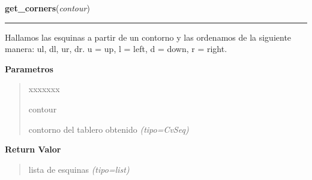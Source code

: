     \label{src:search_goban:get_corners}

    \vspace{0.5ex}

\hspace{.8\funcindent}\begin{boxedminipage}{\funcwidth}

    \raggedright \textbf{get\_corners}(\textit{contour})

    \vspace{-1.5ex}

    \rule{\textwidth}{0.5\fboxrule}
\setlength{\parskip}{2ex}
Hallamos las esquinas a partir de un contorno y las ordenamos de la siguiente manera: ul, dl, ur, dr.  u = up, l = left, d = down, r = right.

\setlength{\parskip}{1ex}
      \textbf{Parametros}
      \vspace{-1ex}

      \begin{quote}
        \begin{Ventry}{xxxxxxx}

          \item[contour]


contorno del tablero obtenido
            {\it (tipo=CvSeq)}

        \end{Ventry}

      \end{quote}

      \textbf{Return Valor}
    \vspace{-1ex}

      \begin{quote}

lista de esquinas
      {\it (tipo=list)}

      \end{quote}

    \end{boxedminipage}

    \label{src:search_goban:filter_image}

    \vspace{0.5ex}


